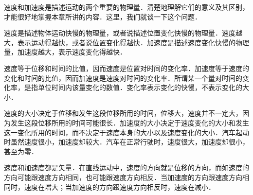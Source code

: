 \begin{Information}[速度和加速度的区别]

速度和加速度是描述运动的两个重要的物理量．清楚地理解它们的意义及其区别，才能很好地掌握本章所讲的内容．这里，我们就谈一下这个问题．

速度是描述物体运动快慢的物理量，或者说描述位置变化快慢的物理量．速度越大，表示运动得越快，或者说位置变化得越快．加速度是描述速度变化快慢的物理量，加速度越大，表示速度变化得越快．

速度等于位移和时间的比值，因而速度是位置对时间的变化率．加速度等于速度的变化和时间的比值，因而加速度是速度对时间的变化率．所谓某一个量对时间的变化率，是指单位时间内该量变化的数值．变化率表示变化的快慢，不表示变化的大小．

速度的大小决定于位移和发生这段位移所用的时间，位移大，速度并不一定大，因为发生这段位移所用的时间可能很长．加速度的大小决定于速度变化的大小和发生这一变化所用的时间，而不决定于速度本身的大小以及速度变化的大小．汽车起动时虽然速度很小，加速度却较大．汽车在正常行驶时，速度很大，加速度却很小，甚至为零．

速度和加速度都是矢量．在直线运动中，速度的方向就是位移的方向，而如速度的方向可能跟速度方向相同，也可能跟速度方向相反．当加速度的方向跟速度方向相同时，速度在增大；当加速度的方向跟速度方向相反时，速度在减小．
\end{Information}





